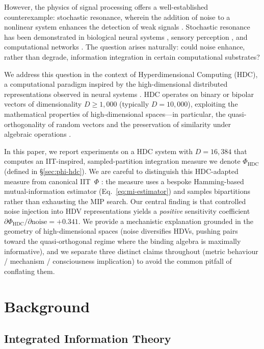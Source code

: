 \documentclass[12pt,a4paper]{article}
\begin{document}
However, the physics of signal processing offers a well-established counterexample: stochastic resonance, wherein the addition of noise to a nonlinear system enhances the detection of weak signals \citep{gammaitoni1998stochastic, benzi1981mechanism}. Stochastic resonance has been demonstrated in biological neural systems \citep{moss2004stochastic, mcdonnell2011benefits}, sensory perception \citep{collins1995aperiodic}, and computational networks \citep{stocks2000suprathreshold}. The question arises naturally: could noise enhance, rather than degrade, information integration in certain computational substrates?

We address this question in the context of Hyperdimensional Computing (HDC), a computational paradigm inspired by the high-dimensional distributed representations observed in neural systems \citep{kanerva2009hyperdimensional, plate1995holographic}. HDC operates on binary or bipolar vectors of dimensionality $D \geq 1{,}000$ (typically $D = 10{,}000$), exploiting the mathematical properties of high-dimensional spaces---in particular, the quasi-orthogonality of random vectors and the preservation of similarity under algebraic operations \citep{kanerva2009hyperdimensional}.

In this paper, we report experiments on a HDC system with $D = 16{,}384$ that computes an IIT-inspired, sampled-partition integration measure we denote $\Phi_{\text{HDC}}$ (defined in \S\ref{sec:phi-hdc}). We are careful to distinguish this HDC-adapted measure from canonical IIT~$\Phi$ \citep{oizumi2014phenomenology}: the measure uses a bespoke Hamming-based mutual-information estimator (Eq.~\ref{eq:mi-estimator}) and samples bipartitions rather than exhausting the MIP search. Our central finding is that controlled noise injection into HDV representations yields a \emph{positive} sensitivity coefficient $\partial\Phi_{\text{HDC}}/\partial\text{noise} = +0.341$. We provide a mechanistic explanation grounded in the geometry of high-dimensional spaces (noise diversifies HDVs, pushing pairs toward the quasi-orthogonal regime where the binding algebra is maximally informative), and we separate three distinct claims throughout (metric behaviour / mechanism / consciousness implication) to avoid the common pitfall of conflating them.

\section{Background}

\subsection{Integrated Information Theory}
\end{document}

